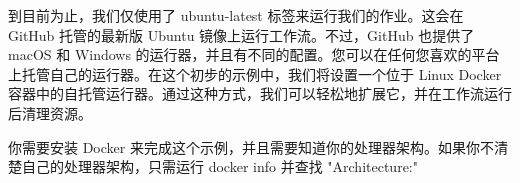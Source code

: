 
到目前为止，我们仅使用了 ubuntu-latest 标签来运行我们的作业。这会在 GitHub 托管的最新版 Ubuntu 镜像上运行工作流。不过，GitHub 也提供了 macOS 和 Windows 的运行器，并且有不同的配置。您可以在任何您喜欢的平台上托管自己的运行器。在这个初步的示例中，我们将设置一个位于 Linux Docker 容器中的自托管运行器。通过这种方式，我们可以轻松地扩展它，并在工作流运行后清理资源。


你需要安装 Docker 来完成这个示例，并且需要知道你的处理器架构。如果你不清楚自己的处理器架构，只需运行 docker info 并查找 "Architecture:"



